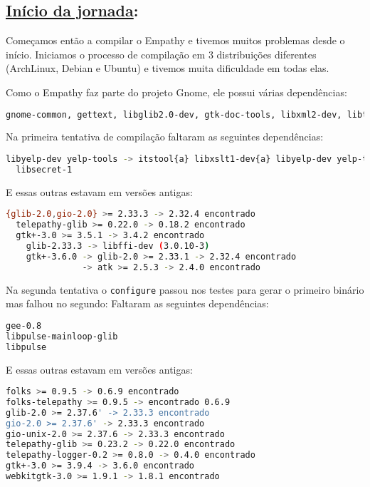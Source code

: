 \subsection*{\underline{Início da jornada}:}
Começamos então a compilar o Empathy e tivemos muitos problemas desde o início.
Iniciamos o processo de compilação em 3 distribuições diferentes (ArchLinux,
Debian e Ubuntu) e tivemos muita dificuldade em todas elas.

Como o Empathy faz parte do projeto Gnome, ele possui várias dependências:
\begin{lstlisting}[language=bash]
	gnome-common, gettext, libglib2.0-dev, gtk-doc-tools, libxml2-dev, libtelepathy-glib-dev, libmissioncontrol-client-dev, libtelepathy-farsight-dev, libx11-dev, libgtk2.0-dev, libice-dev{a}, libcanberra-gtk-dev, libgstreamer-plugins-base0.10-dev, libebook1.2-dev, libnotify-dev, libunique-dev, libgnome-keyring-dev, libtelepathy-logger-dev, libwebkitgtk-3.0-dev, libgnutls-dev, libfolks-telepathy-dev, libcanberra-gtk3-dev, libgcr-3-dev, gsettings-desktop-schemas-dev
\end{lstlisting}
Na primeira tentativa de compilação faltaram as seguintes dependências:
\begin{lstlisting}[language=bash]
  libyelp-dev yelp-tools -> itstool{a} libxslt1-dev{a} libyelp-dev yelp-tools zip{a}
  libsecret-1
\end{lstlisting}
    E essas outras estavam em versões antigas:
\begin{lstlisting}[language=bash]
  {glib-2.0,gio-2.0} >= 2.33.3 -> 2.32.4 encontrado
  telepathy-glib >= 0.22.0 -> 0.18.2 encontrado
  gtk+-3.0 >= 3.5.1 -> 3.4.2 encontrado
  	glib-2.33.3 -> libffi-dev (3.0.10-3)
  	gtk+-3.6.0 -> glib-2.0 >= 2.33.1 -> 2.32.4 encontrado
               -> atk >= 2.5.3 -> 2.4.0 encontrado
\end{lstlisting}
Na segunda tentativa o \texttt{configure} passou nos testes para gerar o
primeiro binário mas falhou no segundo:
Faltaram as seguintes dependências:
\begin{lstlisting}[language=bash]
gee-0.8
libpulse-mainloop-glib
libpulse
\end{lstlisting}
E essas outras estavam em versões antigas:
\begin{lstlisting}[language=bash]
folks >= 0.9.5 -> 0.6.9 encontrado
folks-telepathy >= 0.9.5 -> encontrado 0.6.9
glib-2.0 >= 2.37.6' -> 2.33.3 encontrado
gio-2.0 >= 2.37.6' -> 2.33.3 encontrado
gio-unix-2.0 >= 2.37.6 -> 2.33.3 encontrado
telepathy-glib >= 0.23.2 -> 0.22.0 encontrado
telepathy-logger-0.2 >= 0.8.0 -> 0.4.0 encontrado
gtk+-3.0 >= 3.9.4 -> 3.6.0 encontrado
webkitgtk-3.0 >= 1.9.1 -> 1.8.1 encontrado
\end{lstlisting}

